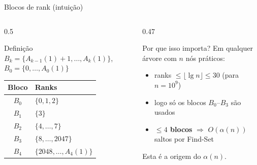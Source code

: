 \documentclass[aspectratio=169]{beamer}
\begin{document}
\begin{frame}{Blocos de rank (intuição)}%
  \begin{columns}[T]
    \begin{column}{0.5\textwidth}
      \begin{block}{Definição}
        $B_k = \bigl\{A_{k-1}(1)+1,\ldots,A_k(1)\bigr\}$,\ \ $B_0=\{0,\ldots,A_0(1)\}$\\[4pt]
        \renewcommand{\arraystretch}{1.25}
        \begin{tabular}{cl}
          \toprule
          \textbf{Bloco} & \textbf{Ranks} \\
          \midrule
          $B_0$ & $\{0,1,2\}$ \\
          $B_1$ & $\{3\}$ \\
          $B_2$ & $\{4,\ldots,7\}$ \\
          $B_3$ & $\{8,\ldots,2047\}$ \\
          $B_4$ & $\{2048,\ldots,A_4(1)\}$ \\
          \bottomrule
        \end{tabular}
      \end{block}
    \end{column}
    \begin{column}{0.47\textwidth}
      \begin{exampleblock}{Por que isso importa?}
        Em qualquer árvore com $n$ nós práticos:\\
        \begin{itemize}
          \item ranks $\leq \lfloor\lg n\rfloor \leq 30$ (para $n=10^9$)
          \item logo só os blocos $B_0$--$B_3$ são usados
          \item \textbf{$\leq 4$ blocos} $\Rightarrow$ $O(\alpha(n))$ saltos por Find-Set
        \end{itemize}
        Esta é a origem do $\alpha(n)$.
      \end{exampleblock}
    \end{column}
  \end{columns}
\end{frame}
\end{document}
